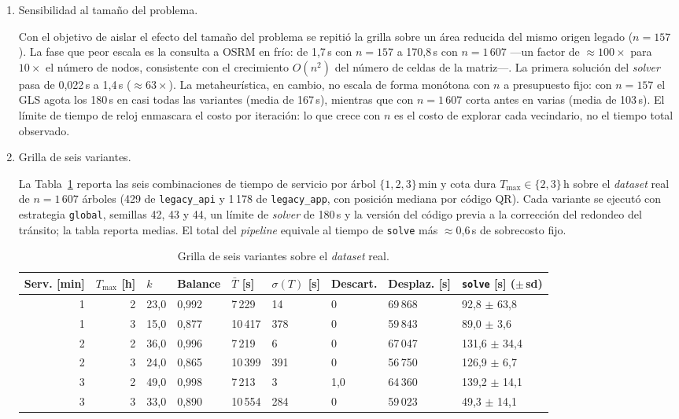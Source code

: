 \begin{enumerate}
\item Sensibilidad al tamaño del problema.

Con el objetivo de aislar el efecto del tamaño del problema se repitió la grilla sobre un área
reducida del mismo origen legado ($n=157$). La fase que peor escala es la consulta a OSRM en frío:
de 1,7\,s con $n=157$ a 170,8\,s con $n=1\,607$ ---un factor de $\approx 100\times$ para $10\times$
el número de nodos, consistente con el crecimiento $O(n^2)$ del número de celdas de la matriz---. La
primera solución del \textit{solver} pasa de 0,022\,s a 1,4\,s ($\approx 63\times$). La
metaheurística, en cambio, no escala de forma monótona con $n$ a presupuesto fijo: con $n=157$ el
GLS agota los 180\,s en casi todas las variantes (media de 167\,s), mientras que con $n=1\,607$
corta antes en varias (media de 103\,s). El límite de tiempo de reloj enmascara el costo por
iteración: lo que crece con $n$ es el costo de explorar cada vecindario, no el tiempo total
observado.


\item Grilla de seis variantes.

La Tabla~\ref{tab:grilla-variantes} reporta las seis combinaciones de tiempo de servicio por árbol
$\{1, 2, 3\}$\,min y cota dura $T_{\max} \in \{2, 3\}$\,h sobre el \textit{dataset} real de
$n=1\,607$ árboles (429 de \texttt{legacy\_api} y 1\,178 de \texttt{legacy\_app}, con posición
mediana por código QR). Cada variante se ejecutó con estrategia \texttt{global}, semillas 42, 43 y
44, un límite de \textit{solver} de 180\,s y la versión del código previa a la corrección del
redondeo del tránsito; la tabla reporta medias. El total del \textit{pipeline} equivale al tiempo de
\texttt{solve} más $\approx$0{,}6\,s de sobrecosto fijo.

\begin{table}[H]
  \centering
  \caption{Grilla de seis variantes sobre el \textit{dataset} real.}
  \label{tab:grilla-variantes}
  \small
  \begin{tabularx}{\textwidth}{rrXXXXXXX}
    \toprule
    Serv. [min] &
      $T_{\max}$ [h] &
      $k$ &
      Balance &
      $\bar{T}$ [s] &
      $\sigma(T)$ [s] &
      Descart. &
      Desplaz. [s] &
      \texttt{solve} [s] ($\pm$\,sd) \\
    \midrule
    1 & 2 & 23{,}0 & 0{,}992 & 7\,229  & 14  & 0     & 69\,868 & 92{,}8 $\pm$ 63{,}8 \\
    1 & 3 & 15{,}0 & 0{,}877 & 10\,417 & 378 & 0     & 59\,843 & 89{,}0 $\pm$ 3{,}6 \\
    2 & 2 & 36{,}0 & 0{,}996 & 7\,219  & 6   & 0     & 67\,047 & 131{,}6 $\pm$ 34{,}4 \\
    2 & 3 & 24{,}0 & 0{,}865 & 10\,399 & 391 & 0     & 56\,750 & 126{,}9 $\pm$ 6{,}7 \\
    3 & 2 & 49{,}0 & 0{,}998 & 7\,213  & 3   & 1{,}0 & 64\,360 & 139{,}2 $\pm$ 14{,}1 \\
    3 & 3 & 33{,}0 & 0{,}890 & 10\,554 & 284 & 0     & 59\,023 & 49{,}3 $\pm$ 14{,}1 \\
    \bottomrule
  \end{tabularx}
\end{table}


\end{enumerate}
